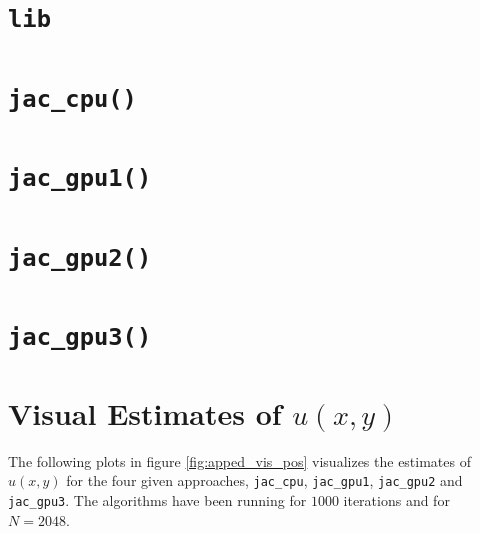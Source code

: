 
\section{\texttt{lib}}



\newpage
\section{\texttt{jac\_cpu()}}



\newpage
\section{\texttt{jac\_gpu1()}}


\newpage
\section{\texttt{jac\_gpu2()}}



\newpage
\section{\texttt{jac\_gpu3()}}





\newpage
\section{Visual Estimates of $u(x,y)$}

The following plots in figure \ref{fig:apped_vis_pos} visualizes the estimates of $u(x,y)$ for the four given approaches, \texttt{jac\_cpu}, \texttt{jac\_gpu1}, \texttt{jac\_gpu2} and \texttt{jac\_gpu3}.
The algorithms have been running for $1000$ iterations and for $N=2048$.


